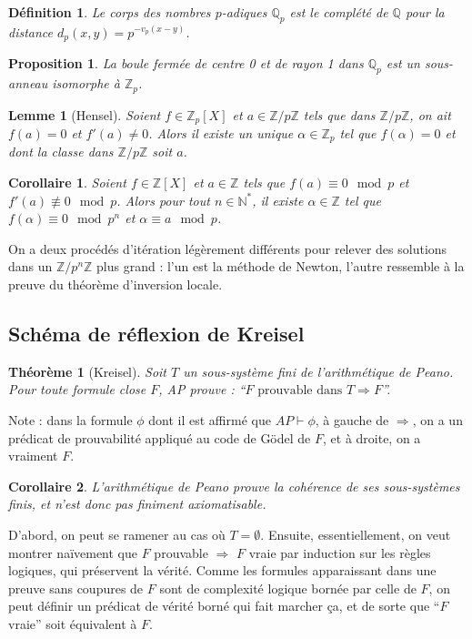 \documentclass[a4paper, 11pt]{article}
\def\Z{\mathbb{Z}}
\def\N{\mathbb{N}}
\def\Q{\mathbb{Q}}
\newtheorem*{definition}{Définition}
\newtheorem*{proposition}{Proposition}
\newtheorem*{theorem}{Théorème}
\newtheorem*{lemma}{Lemme}
\newtheorem*{corollary}{Corollaire}
\begin{document}
\begin{definition}
  Le \emph{corps des nombres $p$-adiques} $\Q_p$ est le complété de
  $\Q$ pour la distance $d_p(x,y) = p^{-v_p(x-y)}$.
\end{definition}
\begin{proposition}
  La boule fermée de centre 0 et de rayon 1 dans $\Q_p$ est un
  sous-anneau isomorphe à $\Z_p$.
\end{proposition}

\begin{lemma}[Hensel]
  Soient $f \in \Z_p[X]$ et $a \in \Z/p\Z$ tels que dans $\Z/p\Z$, on
  ait $f(a) = 0$ et $f'(a) \neq 0$. Alors il existe un unique
  $\alpha \in \Z_p$ tel que $f(\alpha) = 0$ et dont la classe dans
  $\Z/p\Z$ soit $a$.
\end{lemma}

\begin{corollary}
  Soient $f \in \Z[X]$ et $a \in \Z$ tels que $f(a) \equiv 0 \mod p$
  et $f'(a) \not\equiv 0 \mod p$. Alors pour tout $n \in \N^*$, il
  existe $\alpha \in \Z$ tel que $f(\alpha) \equiv 0 \mod p^n$ et
  $\alpha \equiv a \mod p$.
\end{corollary}

On a deux procédés d'itération légèrement différents pour relever des solutions
dans un $\Z/p^n\Z$ plus grand : l'un est la méthode de Newton, l'autre ressemble
à la preuve du théorème d'inversion locale.

\subsection{Schéma de réflexion de Kreisel}

\begin{theorem}[Kreisel]
  Soit $T$ un sous-système fini de l'arithmétique de Peano. Pour toute formule
  close $F$, AP prouve : \enquote{$F \text{ prouvable dans } T \Rightarrow F$}.
\end{theorem}
Note : dans la formule $\phi$ dont il est affirmé que $AP \vdash \phi$, à gauche
de $\Rightarrow$, on a un prédicat de prouvabilité appliqué au code de Gödel de
$F$, et à droite, on a vraiment $F$.
\begin{corollary}
  L'arithmétique de Peano prouve la cohérence de ses sous-systèmes finis, et
  n'est donc pas finiment axiomatisable.
\end{corollary}

D'abord, on peut se ramener au cas où $T = \emptyset$. Ensuite, essentiellement,
on veut montrer naïvement que $F$ prouvable $\Rightarrow$ $F$ vraie par
induction sur les règles logiques, qui préservent la vérité. Comme les formules
apparaissant dans une preuve sans coupures de $F$ sont de complexité logique
bornée par celle de $F$, on peut définir un prédicat de vérité borné qui fait
marcher ça, et de sorte que \enquote{$F$ vraie} soit équivalent à $F$.
\end{document}
